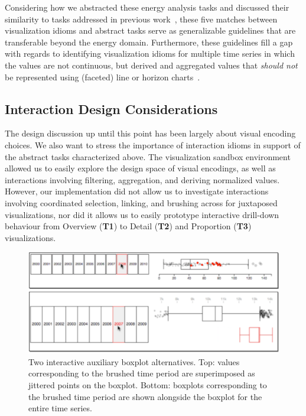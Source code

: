 \documentclass[journal]{vgtc}                %
\begin{document}
Considering how we abstracted these energy analysis tasks and discussed their similarity to tasks addressed in previous work~\cite{Albers2014,Javed2010}, these five matches between visualization idioms and abstract tasks serve as generalizable guidelines that are transferable beyond the energy domain.
Furthermore, these guidelines fill a gap with regards to identifying visualization idioms for multiple time series in which the values are not continuous, but derived and aggregated values that {\it should not} be represented using (faceted) line or horizon charts~\cite{Heer2009}.


\subsection{Interaction Design Considerations}
\label{design-interaction}


The design discussion up until this point has been largely about visual encoding choices. 
We also want to stress the importance of interaction idioms in support of the abstract tasks characterized above.
The visualization sandbox environment allowed us to easily explore the design space of visual encodings, as well as interactions involving filtering, aggregation, and deriving normalized values.
However, our implementation did not allow us to investigate interactions involving coordinated selection, linking, and brushing across for juxtaposed visualizations, nor did it allows us to easily prototype interactive drill-down behaviour from Overview ({\bf T1}) to Detail ({\bf T2}) and Proportion ({\bf T3}) visualizations.

\begin{figure}[ht]
    \vspace{-0.3cm}
	\centering
	\includegraphics[width=\columnwidth]{figures/d3-boxplots.pdf}
	\vspace{-0.6cm}
	\caption{Two interactive auxiliary boxplot alternatives. Top: values corresponding to the brushed time period are superimposed as jittered points on the boxplot. Bottom: boxplots corresponding to the brushed time period are shown alongside the boxplot for the entire time series.}
	\label{fig:interactive-boxplots}
	\vspace{-0.3cm}
\end{figure}
\end{document}

